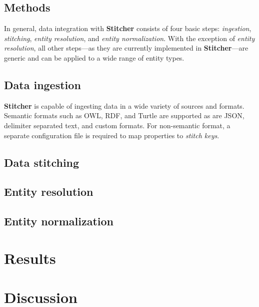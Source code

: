 \documentclass{bioinfo}
\newcommand\st{\textbf{Stitcher}}
\begin{document}
\begin{methods}
\section{Methods}\label{sec:methods}
In general, data integration with \st{} consists of four basic steps: \emph{ingestion}, \emph{stitching}, \emph{entity resolution}, and \emph{entity normalization}. With the exception of \emph{entity resolution}, all other steps---as they are currently implemented in \st---are generic and can be applied to a wide range of entity types.

\subsection{Data ingestion}
\st{} is capable of ingesting data in a wide variety of sources and formats. Semantic formats such as OWL, RDF, and Turtle are supported as are JSON, delimiter separated text, and custom formats. For non-semantic format, a separate configuration file is required to map properties to \emph{stitch keys}.

\subsection{Data stitching}

\subsection{Entity resolution}\label{sec:methods_er}

\subsection{Entity normalization}

\end{methods}

\section{Results}



\section{Discussion}
\end{document}
